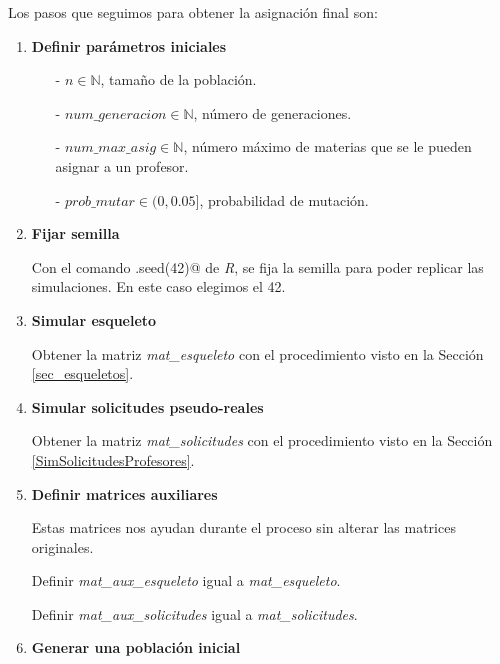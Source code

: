 Los pasos que seguimos para obtener la asignación final son:

\begin{enumerate}
\item \textbf{Definir parámetros iniciales}

\begin{itemize}
\item[-] $n \in \mathbb{N}$, tamaño de la población.

\item[-] $num\_generacion \in \mathbb{N}$, número de generaciones.

\item[-] $num\_max\_asig \in \mathbb{N}$, número máximo de materias que se le pueden asignar a un profesor.

\item[-] $prob\_mutar \in (0,0.05]$, probabilidad de mutación.
\end{itemize}

\item \textbf{Fijar semilla}

Con el comando \verb@set.seed(42)@ de \textit{R}, se fija la semilla para poder replicar las simulaciones. En este caso elegimos el 42.

\item \textbf{Simular esqueleto} \label{paso_sim_esq}

Obtener la matriz \textit{mat\_esqueleto} con el procedimiento visto en la Sección \ref{sec_esqueletos}.

\item \textbf{Simular solicitudes pseudo-reales} \label{paso_sim_solicitudes}

Obtener la matriz \textit{mat\_solicitudes} con el procedimiento visto en la Sección \ref{SimSolicitudesProfesores}.

\item \textbf{Definir matrices auxiliares}

Estas matrices nos ayudan durante el proceso sin alterar las matrices originales.

Definir \textit{mat\_aux\_esqueleto} igual a \textit{mat\_esqueleto}.

Definir \textit{mat\_aux\_solicitudes} igual a \textit{mat\_solicitudes}.



\item \textbf{Generar una población inicial}


\end{enumerate}
